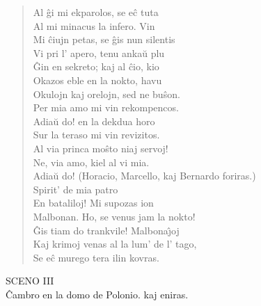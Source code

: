 \begin{verse}
                Al \^gi mi ekparolos, se e\^c tuta\\
                Al mi minacus la infero. Vin\\
                Mi ĉiujn petas, se \^gis nun silentis\\
                Vi pri l' apero, tenu anka\u u plu\\
                \^Gin en sekreto; kaj al \^cio, kio\\
                Okazos eble en la nokto, havu\\
                Okulojn kaj orelojn, sed ne bu\^son.\\
                Per mia amo mi vin rekompencos.\\
                Adia\u u do! en la dekdua horo\\
                Sur la teraso mi vin revizitos.\\
 Al via princa mo\^sto niaj servoj!\\
 Ne, via amo, kiel al vi mia.\\
                Adia\u u do! {\footnotesize (Horacio, Marcello, kaj Bernardo foriras.)}\\
                 Spirit' de mia patro\\
                En bataliloj! Mi supozas ion\\
                Malbonan. Ho, se venus jam la nokto!\\
                \^Gis tiam do trankvile! Malbona\^{\j}oj\\
                Kaj krimoj venas al la lum' de l' tago,\\
                Se e\^c murego tera ilin kovras.\\
\end{verse}

\begin{center}
{\large SCENO III}\\[1ex]

\footnotesize \^Cambro en la domo de Polonio.  kaj  eniras.
\end{center}

